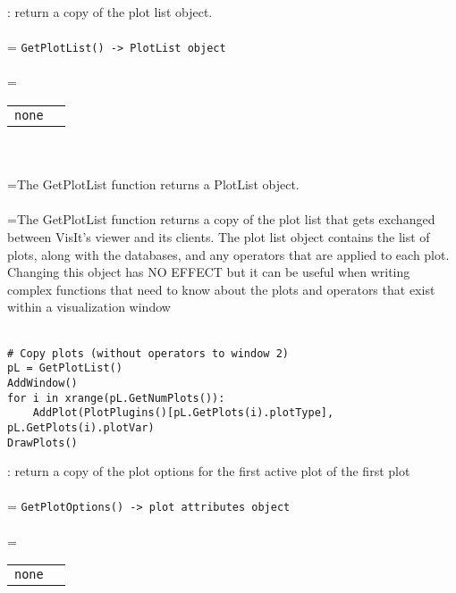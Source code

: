 \documentclass[10pt,a4paper]{report}
\begin{document}
{}
: return a copy of the plot list object.\\[-3mm]

 \\ 
\hangindent=\parindent 
\verb!GetPlotList() -> PlotList object!\\ [-3mm]

 \\ 
\hangindent=\parindent 
\begin{tabular}{ll}
\verb!none! &  \\
\end{tabular} \\[-2mm]


 \\ 
\hangindent=\parindent The GetPlotList function returns a PlotList object. \\[-3mm] 

 \\ 
\hangindent=\parindent The GetPlotList function returns a copy of the plot list that gets exchanged between VisIt's viewer and its clients. The plot list object contains the list of plots, along with the databases, and any operators that are applied to each plot. Changing this object has NO EFFECT but it can be useful when writing complex functions that need to know about the plots and operators that exist within a visualization window \\[-3mm] 

\\[-6mm]
\begin{verbatim}# Copy plots (without operators to window 2)
pL = GetPlotList()
AddWindow()
for i in xrange(pL.GetNumPlots()):
    AddPlot(PlotPlugins()[pL.GetPlots(i).plotType], pL.GetPlots(i).plotVar)
DrawPlots()
\end{verbatim}
\newpage


{}
: return a copy of the plot options for the first active plot of the first plot\\[-3mm]

 \\ 
\hangindent=\parindent 
\verb!GetPlotOptions() -> plot attributes object!\\ [-3mm]

 \\ 
\hangindent=\parindent 
\begin{tabular}{ll}
\verb!none! &  \\
\end{tabular} \\[-2mm]
\end{document}
